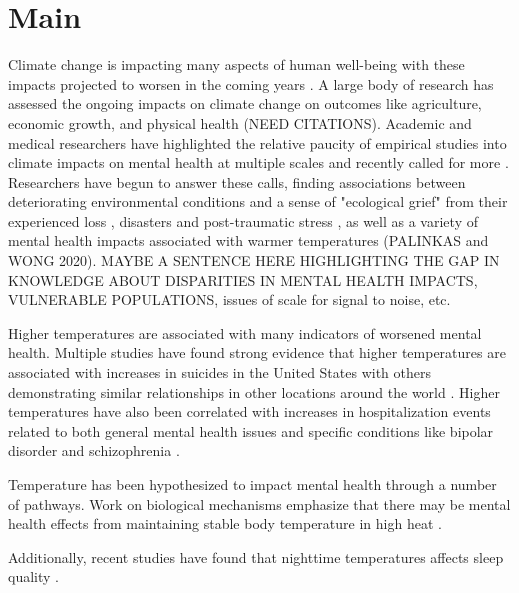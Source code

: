 \documentclass{article}
\begin{document}
\section{Main}
Climate change is impacting many aspects of human well-being with these impacts projected to worsen in the coming years \cite{pachauri2014climate}.  A large body of research has assessed the ongoing impacts on climate change on outcomes like agriculture, economic growth, and physical health (NEED CITATIONS). Academic and medical researchers have highlighted the relative paucity of empirical studies into climate impacts on mental health at multiple scales and recently called for more \cite{Berry2018Apr, hayes_climate_2018}.  Researchers have begun to answer these calls, finding associations between deteriorating environmental conditions and a sense of "ecological grief" from their experienced loss \cite{Cunsolo2018Apr}, disasters and post-traumatic stress \cite{Waite2017Dec, Raker2019Dec}, as well as a variety of mental health impacts associated with warmer temperatures \cite{baylis_weather_2018, Mullins2019Dec} (PALINKAS and WONG 2020).  MAYBE A SENTENCE HERE HIGHLIGHTING THE GAP IN KNOWLEDGE ABOUT DISPARITIES IN MENTAL HEALTH IMPACTS, VULNERABLE POPULATIONS, issues of scale for signal to noise, etc.

Higher temperatures are associated with many indicators of worsened mental health.  Multiple studies have found strong evidence that higher temperatures are associated with increases in suicides in the United States \citep{Burke2018Aug, Mullins2019Dec, Dixon2007May} with others demonstrating similar relationships in other locations around the world \citep{Qi2014Dec, Page2007Aug, Likhvar2011Jan}.  Higher temperatures have also been correlated with increases in hospitalization events related to both general mental health issues \cite{Obradovich2018Oct, Mullins2019Dec} and specific conditions like bipolar disorder and schizophrenia \citep{Lee2007Jan, Shapira2004Feb, Sung2013Feb, Gupta1992Jun, Hansen2008Oct}.

Temperature has been hypothesized to impact mental health through a number of pathways.  Work on biological mechanisms emphasize that there may be mental health effects from maintaining stable body temperature in high heat \cite{Lohmus2018Jul}. 

Additionally, recent studies have found that nighttime temperatures affects sleep quality \citep{Obradovich2017May, Mullins2019Dec}.
\end{document}
